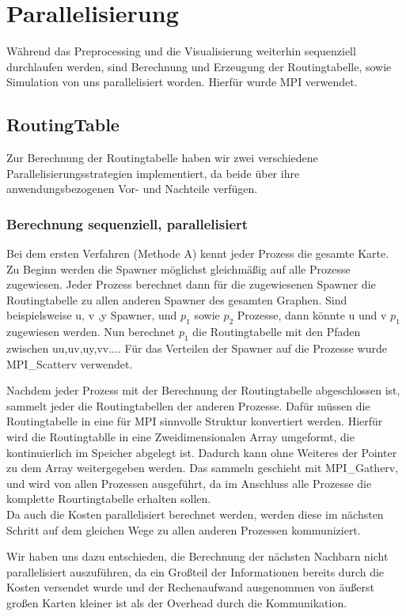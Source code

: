 \documentclass[paper=A4,pagesize=auto,12pt,headinclude=true,footinclude=true,BCOR=0mm,DIV=calc]{scrartcl}
\begin{document}
	\section{Parallelisierung}
	Während das Preprocessing und die Visualisierung weiterhin sequenziell durchlaufen werden, sind Berechnung und Erzeugung der Routingtabelle, sowie Simulation von uns parallelisiert worden. Hierfür wurde MPI verwendet.
	\subsection{RoutingTable}
	Zur Berechnung der Routingtabelle haben wir zwei verschiedene Parallelisierungsstrategien implementiert, da beide über ihre anwendungsbezogenen Vor- und Nachteile verfügen.
	\subsubsection{Berechnung sequenziell, parallelisiert}
	Bei dem ersten Verfahren (Methode A) kennt jeder Prozess die gesamte Karte. Zu Beginn werden die Spawner möglichst gleichmäßig auf alle Prozesse zugewiesen. Jeder Prozess berechnet dann für die zugewiesenen Spawner die Routingtabelle zu allen anderen Spawner des gesamten Graphen. Sind beispielsweise u, v ,y Spawner, und $p_{1}$ sowie $p_{2}$ Prozesse, dann könnte u und v $p_{1}$ zugewiesen werden. Nun berechnet  $p_{1}$ die Routingtabelle mit den Pfaden zwischen uu,uv,uy,vv....
	Für das Verteilen der Spawner auf die Prozesse wurde MPI\_Scatterv verwendet.
	
	Nachdem jeder Prozess mit der Berechnung der Routingtabelle abgeschlossen ist, sammelt jeder die Routingtabellen der anderen Prozesse. Dafür müssen die Routingtabelle in eine für MPI sinnvolle Struktur konvertiert werden. Hierfür wird die Routingtablle in eine Zweidimensionalen Array umgeformt, die kontinuierlich im Speicher abgelegt ist. Dadurch kann ohne Weiteres der Pointer zu dem Array weitergegeben werden. Das sammeln geschieht mit MPI\_Gatherv, und wird von allen Prozessen ausgeführt, da im Anschluss alle Prozesse die komplette Rourtingtabelle erhalten sollen.\\
	Da auch die Kosten parallelisiert berechnet werden, werden diese im nächsten Schritt auf dem gleichen Wege zu allen anderen Prozessen kommuniziert. 
	
	
	Wir haben uns dazu entschieden, die Berechnung der nächsten Nachbarn nicht parallelisiert auszuführen, da ein Großteil der Informationen bereits durch die Kosten versendet wurde und der Rechenaufwand ausgenommen von äußerst großen Karten kleiner ist als der Overhead durch die Kommunikation.
	
\end{document}
